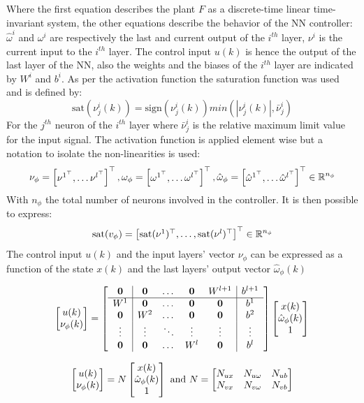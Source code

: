 \documentclass{article}
\begin{document}
Where the first equation describes the plant $F$ as a discrete-time linear time-invariant system, the other equations describe the behavior of the NN controller: $\hat{\omega}^{i}$ and $\omega^{i}$ are respectively the last and current output of the $i^{th}$ layer, $\nu^{i}$ is the current input to the $i^{th}$ layer. The control input $u(k)$ is hence the output of the last layer of the NN, also the weights and the biases of the $i^{th}$ layer are indicated by $W^{i}$ and $b^{i}$. As per the activation function the saturation function was used and is defined by:
$$
   \text{sat}(\nu^{i}_{j}(k)) = \text{sign}(\nu^{i}_{j}(k)) min(|\nu^{i}_{j}(k)|, \bar{\nu}^{i}_{j})
$$  
For the $j^{th}$ neuron of the $i^{th}$ layer where $\bar{\nu}^{i}_{j}$ is the relative maximum limit value for the input signal. The activation function is applied element wise but a notation to isolate the non-linearities is used:
$$
    \nu_{\phi} = \left[\begin{matrix}\nu^{1^\top}, \dots \nu^{l^\top}\end{matrix}\right]^\top, \omega_{\phi} = \left[\begin{matrix}\omega^{1^\top}, \dots \omega^{l^\top}\end{matrix}\right]^\top, \hat{\omega}_{\phi} = \left[\begin{matrix}\hat{\omega}^{1^\top}, \dots \hat{\omega}^{l^\top}\end{matrix}\right]^\top \in {\mathbb{R}}^{n_{\phi}}
$$
With $n_{\phi}$ the total number of neurons involved in the controller. It is then possible to express:
$$
    \text{sat}(v_{\phi}) = \left[\begin{matrix}\text{sat}(\nu^{1})^\top, \dots, \text{sat}(\nu^{l})^\top\end{matrix}\right]^\top \in {\mathbb{R}}^{n_{\phi}}
$$
The control input $u(k)$ and the input layers' vector $\nu_{\phi}$ can be expressed as a function of the state $x(k)$ and the last layers' output vector $\hat{\omega}_{\phi}(k)$

\begin{equation}
    \left[\begin{matrix}u(k)\\ \nu_{\phi}(k)\end{matrix}\right] = \left[\begin{matrix}\begin{array}{c|cccc|c} 
        \operatorname{\mathbf{0}} & \operatorname{\mathbf{0}} & \dots & \operatorname{\mathbf{0}} & W^{l+1} & b^{l+1}\\
        \hline
        W^{1} & \operatorname{\mathbf{0}} & \dots & \operatorname{\mathbf{0}} & \operatorname{\mathbf{0}} & b^{1}\\
        \operatorname{\mathbf{0}} & W^{2} & \dots & \operatorname{\mathbf{0}} & \operatorname{\mathbf{0}} & b^{2}\\
        \vdots & \vdots & \ddots & \vdots & \vdots & \vdots\\
        \operatorname{\mathbf{0}} & \operatorname{\mathbf{0}} & \dots & W^{l} & \operatorname{\mathbf{0}} & b^{l}
    \end{array}\end{matrix}\right]  \left[\begin{matrix}x(k) \\ \hat{\omega}_{\phi}(k) \\ 1\end{matrix}\right]
\end{equation}

$$
    \left[\begin{matrix}u(k)\\ \nu_{\phi}(k)\end{matrix}\right] = N  \left[\begin{matrix}x(k) \\ \hat{\omega}_{\phi}(k) \\ 1\end{matrix}\right]\text{ and } N = \left[\begin{matrix}N_{ux} & N_{u \omega} & N_{ub} \\ N_{vx} & N_{v \omega} & N_{vb}\end{matrix}\right]
$$
\end{document}
